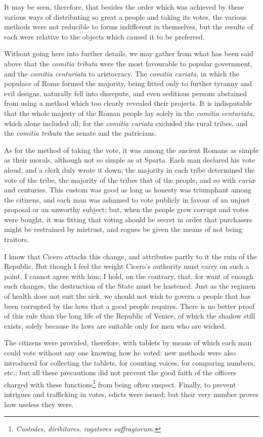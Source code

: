 \documentclass[12pt]{book}
\begin{document}
It may be seen, therefore, that besides the order which was achieved by these various ways of distributing so great a people and taking its votes, the various methods were not reducible to forms indifferent in themselves, but the results of each were relative to the objects which caused it to be preferred.

Without going here into further details, we may gather from what has been said above that the \textit{comitia tributa} were the most favourable to popular government, and the \textit{comitia centuriata} to aristocracy. The \textit{comitia curiata}, in which the populace of Rome formed the majority, being fitted only to further tyranny and evil designs, naturally fell into disrepute, and even seditious persons abstained from using a method which too clearly revealed their projects. It is indisputable that the whole majesty of the Roman people lay solely in the \textit{comitia centuriata}, which alone included all; for the \textit{comitia curiata} excluded the rural tribes, and the \textit{comitia tributa} the senate and the patricians.

As for the method of taking the vote, it was among the ancient Romans as simple as their morals, although not so simple as at Sparta. Each man declared his vote aloud, and a clerk duly wrote it down; the majority in each tribe determined the vote of the tribe, the majority of the tribes that of the people, and so with \textit{curiæ} and centuries. This custom was good as long as honesty was triumphant among the citizens, and each man was ashamed to vote publicly in favour of an unjust proposal or an unworthy subject; but, when the people grew corrupt and votes were bought, it was fitting that voting should be secret in order that purchasers might be restrained by mistrust, and rogues be given the means of not being traitors.

I know that Cicero attacks this change, and attributes partly to it the ruin of the Republic. But though I feel the weight Cicero's authority must carry on such a point, I cannot agree with him; I hold, on the contrary, that, for want of enough such changes, the destruction of the State must be hastened. Just as the regimen of health does not suit the sick, we should not wish to govern a people that has been corrupted by the laws that a good people requires. There is no better proof of this rule than the long life of the Republic of Venice, of which the shadow still exists, solely because its laws are suitable only for men who are wicked.

The citizens were provided, therefore, with tablets by means of which each man could vote without any one knowing how he voted: new methods were also introduced for collecting the tablets, for counting voices, for comparing numbers, etc.; but all these precautions did not prevent the good faith of the officers charged with these functions\footnote{\textit{Custodes, diribitores, rogatores suffragiorum.}} from being often suspect. Finally, to prevent intrigues and trafficking in votes, edicts were issued; but their very number proves how useless they were.
\end{document}

